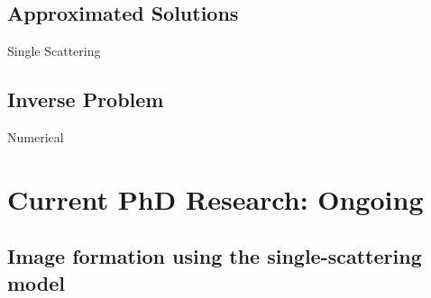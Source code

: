 \documentclass[compress,red,12pt]{beamer}
\begin{document}
\subsection{Approximated Solutions}

\begin{frame}{Single Scattering}
  
\end{frame}


\subsection{Inverse Problem}

\begin{frame}{Numerical}
  
\end{frame}


\section{Current PhD Research: Ongoing}


\subsection{Image formation using the single-scattering model}
\end{document}
